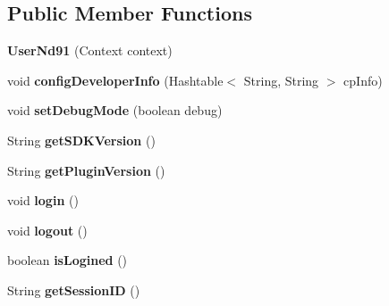 \subsection*{Public Member Functions}
\begin{DoxyCompactItemize}
\item 
\mbox{\label{classorg_1_1cocos2dx_1_1plugin_1_1UserNd91_a55cd7011b9990c5cb0a40191270c2070}} 
{\bfseries User\+Nd91} (Context context)
\item 
\mbox{\label{classorg_1_1cocos2dx_1_1plugin_1_1UserNd91_a21307bcab7543c2ee6d4f7721090b1cc}} 
void {\bfseries config\+Developer\+Info} (Hashtable$<$ String, String $>$ cp\+Info)
\item 
\mbox{\label{classorg_1_1cocos2dx_1_1plugin_1_1UserNd91_ad8ffb787ef09f596594355eab87bcddf}} 
void {\bfseries set\+Debug\+Mode} (boolean debug)
\item 
\mbox{\label{classorg_1_1cocos2dx_1_1plugin_1_1UserNd91_ab6496ce602c8ec68fb310d236fdefcda}} 
String {\bfseries get\+S\+D\+K\+Version} ()
\item 
\mbox{\label{classorg_1_1cocos2dx_1_1plugin_1_1UserNd91_a1505c7bfcb87c8e7c10c39436cbfc432}} 
String {\bfseries get\+Plugin\+Version} ()
\item 
\mbox{\label{classorg_1_1cocos2dx_1_1plugin_1_1UserNd91_ae0563e73f4e6899354e3c7ff8276520b}} 
void {\bfseries login} ()
\item 
\mbox{\label{classorg_1_1cocos2dx_1_1plugin_1_1UserNd91_a723dd2323990578e79f22ec5f68e05f3}} 
void {\bfseries logout} ()
\item 
\mbox{\label{classorg_1_1cocos2dx_1_1plugin_1_1UserNd91_a7bd89950ce61b45a82a997979e3b1c44}} 
boolean {\bfseries is\+Logined} ()
\item 
\mbox{\label{classorg_1_1cocos2dx_1_1plugin_1_1UserNd91_a0504d43287a347c564cb98341f4140ce}} 
String {\bfseries get\+Session\+ID} ()
\end{DoxyCompactItemize}
